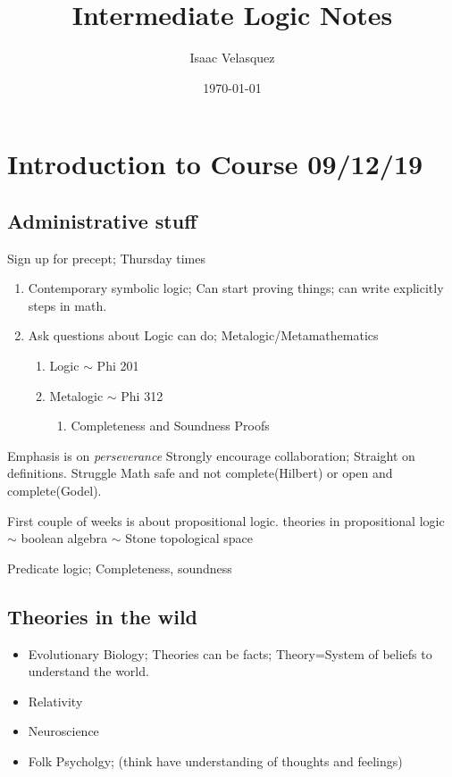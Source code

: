 \documentclass[11pt]{article}
\author{Isaac Velasquez}
\date{\today}
\title{Intermediate Logic Notes}
\begin{document}
\maketitle
\tableofcontents


\section{Introduction to Course 09/12/19}
\label{sec:orge593f7d}
\subsection{Administrative stuff}
\label{sec:orgb422adb}
Sign up for precept; Thursday times

\begin{enumerate}
\item Contemporary symbolic logic; Can start proving things; can write explicitly steps in math.
\item Ask questions about Logic can do; Metalogic/Metamathematics
\begin{enumerate}
\item Logic \(\sim\) Phi 201
\item Metalogic \(\sim\) Phi 312
\begin{enumerate}
\item Completeness and Soundness Proofs
\end{enumerate}
\end{enumerate}
\end{enumerate}
Emphasis is on \emph{perseverance}
Strongly encourage collaboration; Straight on definitions. Struggle
Math safe and not complete(Hilbert) or open and complete(Godel).


First couple of weeks is about propositional logic. 
theories in propositional logic \(\sim\) boolean algebra \(\sim\) Stone topological space

Predicate logic; Completeness, soundness
\subsection{Theories in the wild}
\label{sec:orgcde898d}

\begin{itemize}
\item Evolutionary Biology; Theories can be facts; Theory=System of beliefs to understand the world.
\item Relativity
\item Neuroscience
\item Folk Psycholgy; (think have understanding of thoughts and feelings)
\end{itemize}
\end{document}
